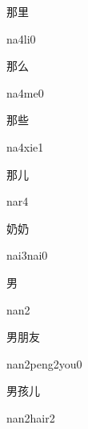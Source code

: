 \begin{verbete}[na4li0]{那里}
\begin{pronuncia}{na4li0}
\end{pronuncia}
\end{verbete}

\begin{verbete}[na4me0]{那么}
\begin{pronuncia}{na4me0}
\end{pronuncia}
\end{verbete}

\begin{verbete}[na4xie1]{那些}
\begin{pronuncia}{na4xie1}
\end{pronuncia}
\end{verbete}

\begin{verbete}[nar4]{那儿}
\begin{pronuncia}{nar4}
\end{pronuncia}
\end{verbete}

\begin{verbete}{奶奶}
\begin{pronuncia}{nai3nai0}
\end{pronuncia}
\end{verbete}

\begin{verbete}[nan2]{男}
\begin{pronuncia}{nan2}
\end{pronuncia}
\end{verbete}

\begin{verbete}{男朋友}
\begin{pronuncia}{nan2peng2you0}
\end{pronuncia}
\end{verbete}

\begin{verbete}{男孩儿}
\begin{pronuncia}{nan2hair2}
\end{pronuncia}
\end{verbete}

